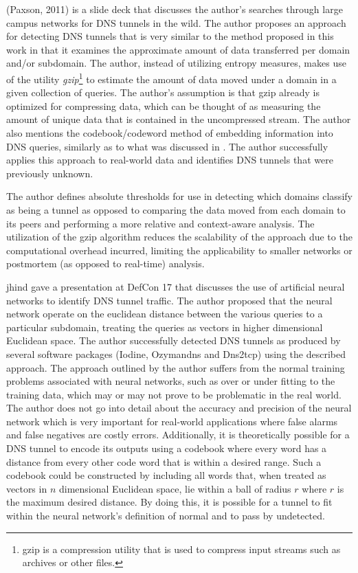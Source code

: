 \documentclass[12pt]{report}
\theoremstyle{remark}
\theoremstyle{definition}
\theoremstyle{definition}
\theoremstyle{definition}
\begin{document}
(Paxson, 2011)\cite{Paxson2011} is a slide deck that discusses the author's
searches through large campus networks for DNS tunnels in the wild. The author
proposes an approach for detecting DNS tunnels that is very similar to the
method proposed in this work in that it examines the approximate amount of data
transferred per domain and/or subdomain. The author, instead of utilizing
entropy measures, makes use of the utility \emph{gzip}\footnote{gzip is a
compression utility that is used to compress input streams such as archives or
other files.} to estimate the amount of data moved under a domain in a given
collection of queries. The author's assumption is that gzip already is optimized
for compressing data, which can be thought of as measuring the amount of unique
data that is contained in the uncompressed stream. The author also mentions the
codebook/codeword method of embedding information into DNS queries, similarly as
to what was discussed in \cite{Butler2011}. The author successfully applies this
approach to real-world data and identifies DNS tunnels that were previously
unknown.

The author defines absolute thresholds for use in detecting which domains
classify as being a tunnel as opposed to comparing the data moved from each
domain to its peers and performing a more relative and context-aware analysis.
The utilization of the gzip algorithm reduces the scalability of the approach
due to the computational overhead incurred, limiting the applicability to
smaller networks or postmortem (as opposed to real-time) analysis.

jhind\cite{jhind2009} gave a presentation at DefCon 17 that discusses the use of
artificial neural networks to identify DNS tunnel traffic. The author proposed
that the neural network operate on the euclidean distance between the various
queries to a particular subdomain, treating the queries as vectors in higher
dimensional Euclidean space. The author successfully detected DNS tunnels as
produced by several software packages (Iodine, Ozymandns and Dns2tcp) using the
described approach. The approach outlined by the author suffers from the normal
training problems associated with neural networks, such as over or under fitting
to the training data, which may or may not prove to be problematic in the real
world. The author does not go into detail about the accuracy and precision of
the neural network which is very important for real-world applications where
false alarms and false negatives are costly errors. Additionally, it is
theoretically possible for a DNS tunnel to encode its outputs using a codebook
where every word has a distance from every other code word that is within a
desired range. Such a codebook could be constructed by including all words that,
when treated as vectors in $n$ dimensional Euclidean space, lie within a ball of
radius $r$ where $r$ is the maximum desired distance. By doing this, it is
possible for a tunnel to fit within the neural network's definition of normal
and to pass by undetected.
\end{document}

